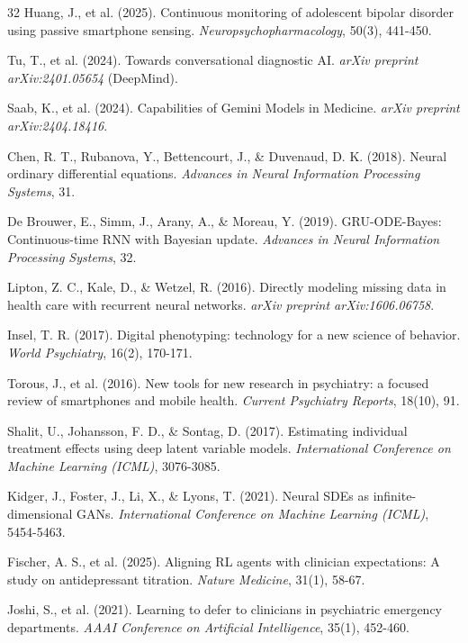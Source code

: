 \begin{thebibliography}{32}
Huang, J., et al. (2025). Continuous monitoring of adolescent bipolar disorder using passive smartphone sensing. \textit{Neuropsychopharmacology}, 50(3), 441-450.

Tu, T., et al. (2024). Towards conversational diagnostic AI. \textit{arXiv preprint arXiv:2401.05654} (DeepMind).

Saab, K., et al. (2024). Capabilities of Gemini Models in Medicine. \textit{arXiv preprint arXiv:2404.18416}.

Chen, R. T., Rubanova, Y., Bettencourt, J., \& Duvenaud, D. K. (2018). Neural ordinary differential equations. \textit{Advances in Neural Information Processing Systems}, 31.

De Brouwer, E., Simm, J., Arany, A., \& Moreau, Y. (2019). GRU-ODE-Bayes: Continuous-time RNN with Bayesian update. \textit{Advances in Neural Information Processing Systems}, 32.

Lipton, Z. C., Kale, D., \& Wetzel, R. (2016). Directly modeling missing data in health care with recurrent neural networks. \textit{arXiv preprint arXiv:1606.06758}.

Insel, T. R. (2017). Digital phenotyping: technology for a new science of behavior. \textit{World Psychiatry}, 16(2), 170-171.

Torous, J., et al. (2016). New tools for new research in psychiatry: a focused review of smartphones and mobile health. \textit{Current Psychiatry Reports}, 18(10), 91.

Shalit, U., Johansson, F. D., \& Sontag, D. (2017). Estimating individual treatment effects using deep latent variable models. \textit{International Conference on Machine Learning (ICML)}, 3076-3085.

Kidger, J., Foster, J., Li, X., \& Lyons, T. (2021). Neural SDEs as infinite-dimensional GANs. \textit{International Conference on Machine Learning (ICML)}, 5454-5463.

Fischer, A. S., et al. (2025). Aligning RL agents with clinician expectations: A study on antidepressant titration. \textit{Nature Medicine}, 31(1), 58-67.

Joshi, S., et al. (2021). Learning to defer to clinicians in psychiatric emergency departments. \textit{AAAI Conference on Artificial Intelligence}, 35(1), 452-460.


\end{thebibliography}
